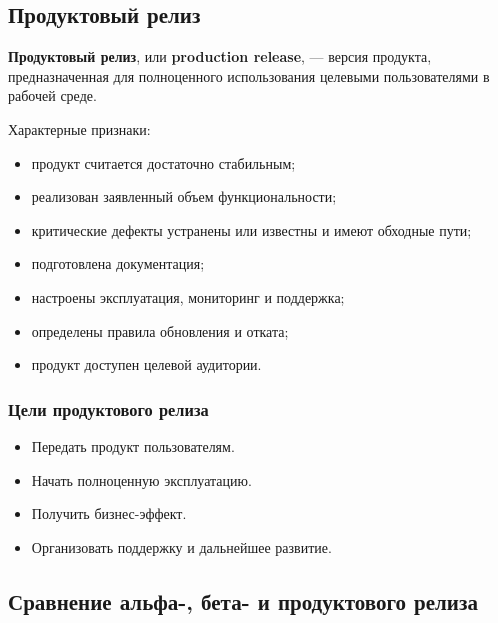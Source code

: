 \documentclass[12pt,a4paper]{article}
\begin{document}
\subsection{Продуктовый релиз}

\textbf{Продуктовый релиз}, или \textbf{production release}, --- версия продукта, предназначенная для полноценного использования целевыми пользователями в рабочей среде.

Характерные признаки:
\begin{itemize}
    \item продукт считается достаточно стабильным;
    \item реализован заявленный объем функциональности;
    \item критические дефекты устранены или известны и имеют обходные пути;
    \item подготовлена документация;
    \item настроены эксплуатация, мониторинг и поддержка;
    \item определены правила обновления и отката;
    \item продукт доступен целевой аудитории.
\end{itemize}

\subsubsection{Цели продуктового релиза}

\begin{itemize}
    \item Передать продукт пользователям.
    \item Начать полноценную эксплуатацию.
    \item Получить бизнес-эффект.
    \item Организовать поддержку и дальнейшее развитие.
\end{itemize}

\subsection{Сравнение альфа-, бета- и продуктового релиза}
\end{document}
